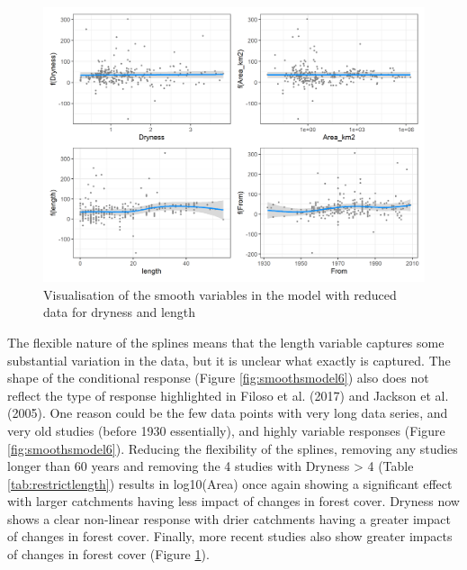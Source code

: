 \documentclass[]{elsarticle} %
\begin{document}
\begin{figure}
\includegraphics[width=0.9\linewidth]{model7_smooths} \caption{Visualisation of the smooth variables in the model with reduced data for dryness and length}\label{fig:smoothsmodel7}
\end{figure}

The flexible nature of the splines means that the length variable captures some substantial variation in the data, but it is unclear what exactly is captured. The shape of the conditional response (Figure \ref{fig:smoothsmodel6}) also does not reflect the type of response highlighted in Filoso et al. (2017) and Jackson et al. (2005). One reason could be the few data points with very long data series, and very old studies (before 1930 essentially), and highly variable responses (Figure \ref{fig:smoothsmodel6}). Reducing the flexibility of the splines, removing any studies longer than 60 years and removing the 4 studies with Dryness \textgreater{} 4 (Table \ref{tab:restrictlength}) results in log10(Area) once again showing a significant effect with larger catchments having less impact of changes in forest cover. Dryness now shows a clear non-linear response with drier catchments having a greater impact of changes in forest cover. Finally, more recent studies also show greater impacts of changes in forest cover (Figure \ref{fig:smoothsmodel7}).
\end{document}
